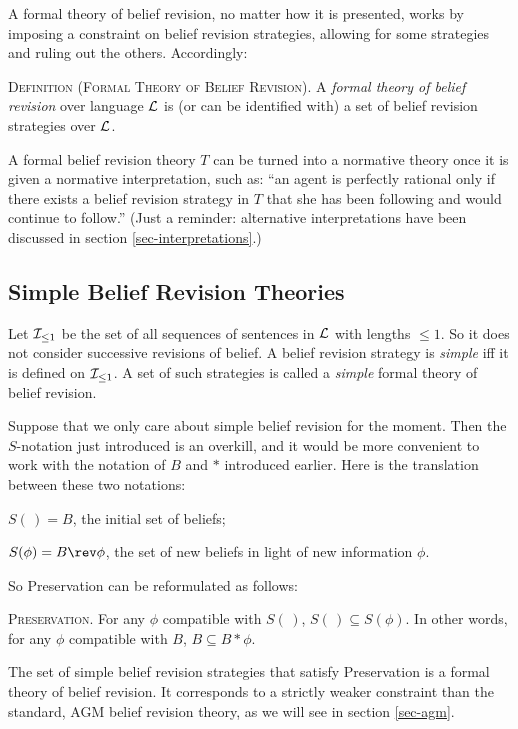 A formal theory of belief revision, no matter how it is presented, works by imposing a constraint on belief revision strategies, allowing for some strategies and ruling out the others. Accordingly: \op

	\xm \textsc{Definition (Formal Theory of Belief Revision).} A {\em formal theory of belief revision} over language ${\cal L}$ is (or can be identified with) a set of belief revision strategies over ${\cal L}$. 

\ed A formal belief revision theory $T$ can be turned into a normative theory once it is given a normative interpretation, such as: ``an agent is perfectly rational only if there exists a belief revision strategy in $T$ that she has been following and would continue to follow.'' (Just a reminder: alternative interpretations have been discussed in section \ref{sec-interpretations}.)

\subsection{Simple Belief Revision Theories}

Let ${\cal I}_{\le 1}$ be the set of all sequences of sentences in ${\cal L}$ with lengths $\leq 1$. So it does not consider successive revisions of belief. A belief revision strategy is {\em simple} iff it is defined on ${\cal I}_{\le 1}$. A set of such strategies is called a {\em simple} formal theory of belief revision.

Suppose that we only care about simple belief revision for the moment. Then the $S$-notation just introduced is an overkill, and it would be more convenient to work with the notation of $B$ and $*$ introduced earlier. Here is the translation between these two notations: \op

	\xm $S(\,) = B$, the initial set of beliefs;

	\xm $S(\phi) = B \rev \phi$, the set of new beliefs in light of new information $\phi$. 

\ed So Preservation can be reformulated as follows: \op

	\xm \textsc{Preservation.}  For any $\phi$ compatible with $S(\,)$, $S(\,) \subseteq S(\phi)$.
	In other words, for any $\phi$ compatible with $B$, $B \subseteq B * \phi$.

\ed The set of simple belief revision strategies that satisfy Preservation is a formal theory of belief revision. It corresponds to a strictly weaker constraint than the standard, AGM belief revision theory, as we will see in section \ref{sec-agm}.


